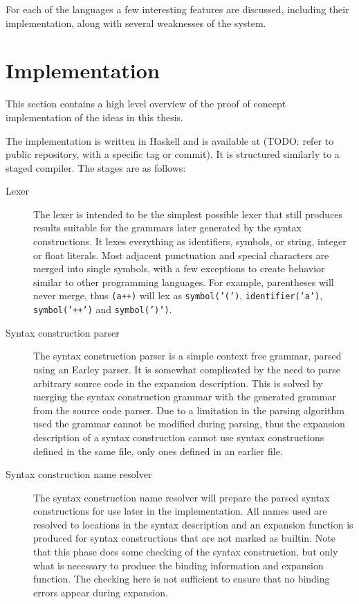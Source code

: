 \documentclass{kththesis}
\begin{document}
For each of the languages a few interesting features are discussed, including their implementation, along with several weaknesses of the system.

\section{Implementation} \label{sec:implementation}

This section contains a high level overview of the proof of concept implementation of the ideas in this thesis.

The implementation is written in Haskell and is available at (TODO: refer to public repository, with a specific tag or commit). It is structured similarly to a staged compiler. The stages are as follows:

\begin{description}
  \item[Lexer] The lexer is intended to be the simplest possible lexer that still produces results suitable for the grammars later generated by the syntax constructions. It lexes everything as identifiers, symbols, or string, integer or float literals. Most adjacent punctuation and special characters are merged into single symbols, with a few exceptions to create behavior similar to other programming languages. For example, parentheses will never merge, thus \texttt{(a++)} will lex as \texttt{symbol('(')}, \texttt{identifier('a')}, \texttt{symbol('++')} and \texttt{symbol(')')}.

  \item[Syntax construction parser] The syntax construction parser is a simple context free grammar, parsed using an Earley parser. It is somewhat complicated by the need to parse arbitrary source code in the expansion description. This is solved by merging the syntax construction grammar with the generated grammar from the source code parser. Due to a limitation in the parsing algorithm used the grammar cannot be modified during parsing, thus the expansion description of a syntax construction cannot use syntax constructions defined in the same file, only ones defined in an earlier file.

  \item[Syntax construction name resolver] The syntax construction name resolver will prepare the parsed syntax constructions for use later in the implementation. All names used are resolved to locations in the syntax description and an expansion function is produced for syntax constructions that are not marked as builtin. Note that this phase does some checking of the syntax construction, but only what is necessary to produce the binding information and expansion function. The checking here is not sufficient to ensure that no binding errors appear during expansion.


\end{description}
\end{document}
